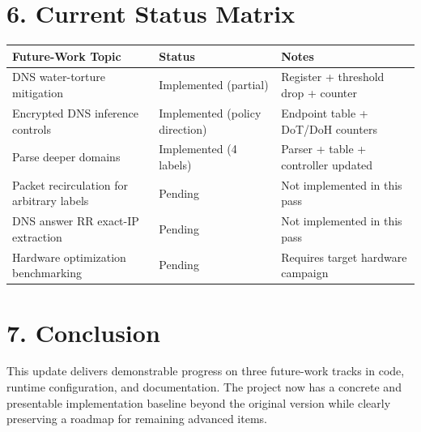 \documentclass[11pt,a4paper]{article}
\begin{document}
\section*{6. Current Status Matrix}
\begin{center}
\begin{tabular}{@{}lll@{}}
\toprule
Future-Work Topic & Status & Notes \\
\midrule
DNS water-torture mitigation & Implemented (partial) & Register + threshold drop + counter \\
Encrypted DNS inference controls & Implemented (policy direction) & Endpoint table + DoT/DoH counters \\
Parse deeper domains & Implemented (4 labels) & Parser + table + controller updated \\
Packet recirculation for arbitrary labels & Pending & Not implemented in this pass \\
DNS answer RR exact-IP extraction & Pending & Not implemented in this pass \\
Hardware optimization benchmarking & Pending & Requires target hardware campaign \\
\bottomrule
\end{tabular}
\end{center}

\section*{7. Conclusion}
This update delivers demonstrable progress on three future-work tracks in code, runtime configuration, and documentation. The project now has a concrete and presentable implementation baseline beyond the original version while clearly preserving a roadmap for remaining advanced items.
\end{document}

